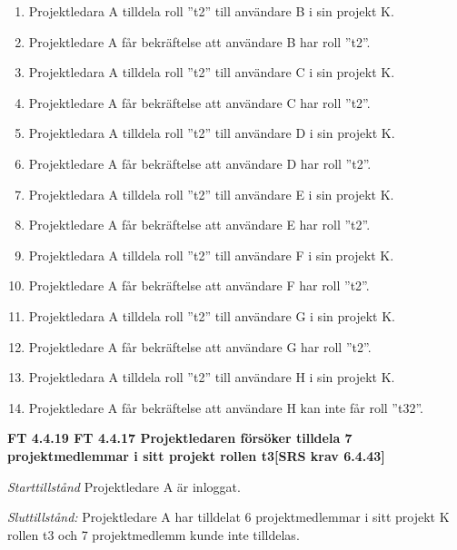 \documentclass[a4paper]{article}
\begin{document}
\begin{enumerate}
\item Projektledara A tilldela roll ”t2” till användare B i sin projekt K. 
\item Projektledare A får bekräftelse att användare B har roll ”t2”.
\item Projektledara A tilldela roll ”t2” till användare C i sin projekt K. 
\item Projektledare A får bekräftelse att användare C har roll ”t2”.
\item Projektledara A tilldela roll ”t2” till användare D i sin projekt K. 
\item Projektledare A får bekräftelse att användare D har roll ”t2”.
\item Projektledara A tilldela roll ”t2” till användare E i sin projekt K. 
\item Projektledare A får bekräftelse att användare E har roll ”t2”.
\item Projektledara A tilldela roll ”t2” till användare F i sin projekt K. 
\item Projektledare A får bekräftelse att användare F har roll ”t2”.
\item Projektledara A tilldela roll ”t2” till användare G i sin projekt K. 
\item Projektledare A får bekräftelse att användare G har roll ”t2”.
\item Projektledara A tilldela roll ”t2” till användare H i sin projekt K. 
\item Projektledare A får bekräftelse att användare H kan inte får roll ”t32”.
\end{enumerate}

\textbf{FT 4.4.19 FT 4.4.17 Projektledaren försöker tilldela 7 projektmedlemmar i sitt projekt rollen t3[SRS krav 6.4.43]}

\emph{Starttillstånd} Projektledare A är inloggat.

\emph{Sluttillstånd:} Projektledare A  har tilldelat 6 projektmedlemmar i sitt projekt K  rollen t3 och 7 projektmedlemm kunde inte tilldelas.
\end{document}
